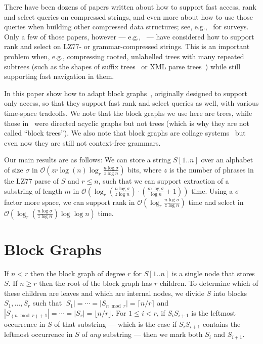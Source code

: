 \documentclass[12pt]{article}
\newcommand{\Oh}[1]
  {\ensuremath{\mathcal{O}\!\left({#1}\right)}}
\begin{document}
There have been dozens of papers written about how to support fast access, rank and select queries on compressed strings, and even more about how to use those queries when building other compressed data structures; see, e.g.,~\cite{RR08,Gag??} for surveys.  Only a few of those papers, however --- e.g.,~\cite{NPV11,NO14,BPT14} --- have considered how to support rank and select 
on LZ77- or grammar-compressed strings.  This is an important problem when, e.g., compressing rooted, unlabelled trees with 
many repeated subtrees (such as the shapes of suffix trees~\cite{NOsea14.1} or XML parse trees~\cite{LMM13}) while still supporting 
fast navigation in them.

In this paper show how to adapt block graphs~\cite{GGP11,GHP14}, originally designed to support only access, so that they support fast rank and select queries as well, with various time-space tradeoffs.
We note that the block graphs we use here are trees, while those in~\cite{GGP11,GHP14} were directed 
acyclic graphs but not trees (which is why they are not called ``block trees''). 
We also note that block graphs are collage systems~\cite{KMSTSA03} but even now they are still not context-free grammars.

Our main results are as follows:  We can store a string \(S [1..n]\) over an alphabet of size $\sigma$ in $\Oh{zr \log (n) \log_r \frac{n\log\sigma}{z\log n}}$ bits, where $z$ is the number of phrases in the LZ77 parse of $S$ and \(r \leq n\), such that we can support extraction of a substring of length $m$ in \(\Oh{\log_r \left( \frac{n\log\sigma}{z\log n} \right) \cdot \left( \frac{m \log \sigma}{\log n} +1 \right)}\) time.  Using a $\sigma$ factor more space, we can support rank in $\Oh{\log_r \frac{n\log\sigma}{z\log n}}$ time and select in $\Oh{\log_r \left( \frac{n\log\sigma}{z\log n} \right) \log \log n}$ time.

\section{Block Graphs}
\label{sec:block_graphs}

If \(n < r\) then the block graph of degree $r$ for \(S [1..n]\) is a single node that stores $S$.  If \(n \geq r\) then the root of the block graph has $r$ children.  To determine which of these children are leaves and which are internal nodes, we divide $S$ into blocks \(S_1, \ldots, S_r\) such that \(|S_1| = \cdots = |S_{n \bmod r}| = \lceil n / r \rceil\) and \(|S_{(n \bmod r) + 1}| = \cdots = |S_r| = \lfloor n / r \rfloor\).  For \(1 \leq i < r\), if \(S_i S_{i + 1}\) is the leftmost occurrence in $S$ of that substring --- which is the case if \(S_i S_{i + 1}\) contains the leftmost occurrence in $S$ of {\em any} substring --- then we mark both $S_i$ and $S_{i + 1}$.
\end{document}
